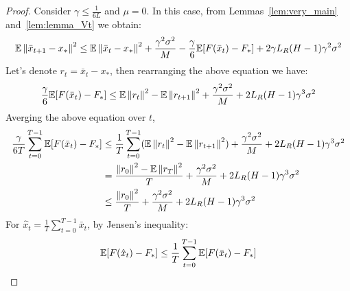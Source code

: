 \begin{proof}
    Consider $\gamma \leq \frac{1}{6L}$ and $\mu = 0$.
    In this case, from Lemmas~\ref{lem:very_main} and~\ref{lem:lemma_Vt} we obtain:
    \begin{align}
        \begin{split}
            \mathbb{E} \left\|\bar{x}_{t+1}-x_*\right\|^2
            \leq
            \mathbb{E} \left\|\bar{x}_t - x_*\right\|^2 
            + \frac{\gamma^2 \sigma^2}{M}
            - \frac{\gamma}{6} \mathbb{E} [F(\bar{x}_t) - F_*] 
            + 2 \gamma L_R (H-1) \gamma^2 \sigma^2
        \end{split}
    \end{align}
    Let's denote $r_t = \bar{x}_t - x_*$, then rearranging the above equation we have:
    \begin{align}
        \begin{split}
            \frac{\gamma}{6} \mathbb{E} [F(\bar{x}_t) - F_*]
            \leq
            \mathbb{E} \left\|r_t\right\|^2 
            - \mathbb{E} \left\|r_{t+1}\right\|^2
            + \frac{\gamma^2 \sigma^2}{M}
            + 2 L_R (H-1) \gamma^3 \sigma^2
        \end{split}
    \end{align}
    Averging the above equation over $t$,
    \begin{align}
        \begin{split}
            \frac{\gamma}{6 T} \sum_{t=0}^{T-1} \mathbb{E} [F(\bar{x}_t) - F_*]
            &\leq 
            \frac{1}{T} \sum_{t=0}^{T-1} 
            (\mathbb{E} \left\|r_t\right\|^2 
            - \mathbb{E} \left\|r_{t+1}\right\|^2)
            + \frac{\gamma^2 \sigma^2}{M}
            + 2 L_R (H-1) \gamma^3 \sigma^2 \\
            &= \frac{\left\|r_0\right\|^2 - \mathbb{E}\left\|r_T\right\|^2}{T}
            + \frac{\gamma^2 \sigma^2}{M}
            + 2 L_R (H-1) \gamma^3 \sigma^2  \\
            &\leq
            \frac{\left\|r_0\right\|^2}{T}
            + \frac{\gamma^2 \sigma^2}{M}
            + 2 L_R (H-1) \gamma^3 \sigma^2 \label{eq:avergingovert}
        \end{split}
    \end{align}
    For $\hat{x}_t = \frac{1}{T} \sum_{t=0}^{T-1} \bar{x}_t$, by Jensen's inequality:
    \begin{align}
        \begin{split}
            \mathbb{E} [F(\hat{x}_t) - F_*] \leq \frac{1}{T} \sum_{t=0}^{T-1} \mathbb{E} [F(\bar{x}_t) - F_*] \label{eq:jens}
        \end{split}
    \end{align}

\end{proof}
